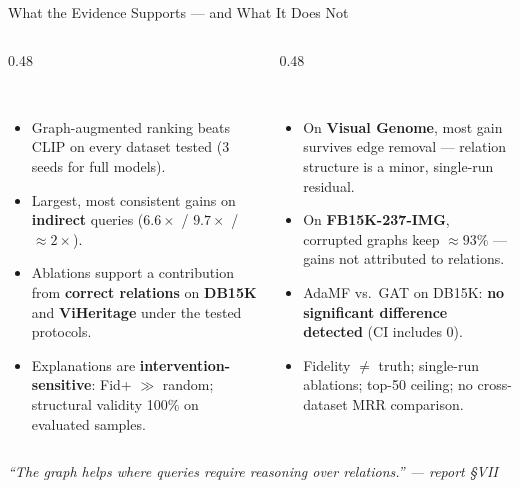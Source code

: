 \documentclass[aspectratio=169,10pt]{beamer}
\begin{document}
\begin{frame}{What the Evidence Supports --- and What It Does Not}
  \begin{columns}[t]
    \begin{column}{0.48\textwidth}
      \begin{block}{\textcolor{white}{Supported by experiments}}\footnotesize
        \begin{itemize}
          \item Graph-augmented ranking beats CLIP on every dataset tested (3 seeds for full models).
          \item Largest, most consistent gains on \textbf{indirect} queries ($6.6\times$ / $9.7\times$ / ${\approx}2\times$).
          \item Ablations support a contribution from \textbf{correct relations} on \textbf{DB15K} and \textbf{ViHeritage} under the tested protocols.
          \item Explanations are \textbf{intervention-sensitive}: Fid+ $\gg$ random; structural validity 100\% on evaluated samples.
        \end{itemize}
      \end{block}
    \end{column}
    \begin{column}{0.48\textwidth}
      \begin{alertblock}{\textcolor{white}{Not claimed / open}}\footnotesize
        \begin{itemize}
          \item On \textbf{Visual Genome}, most gain survives edge removal --- relation structure is a minor, single-run residual.
          \item On \textbf{FB15K-237-IMG}, corrupted graphs keep ${\approx}93\%$ --- gains not attributed to relations.
          \item AdaMF vs.\ GAT on DB15K: \textbf{no significant difference detected} (CI includes 0).
          \item Fidelity $\ne$ truth; single-run ablations; top-50 ceiling; no cross-dataset MRR comparison.
        \end{itemize}
      \end{alertblock}
    \end{column}
  \end{columns}
  \vspace{0.1cm}
  \begin{center}
    \footnotesize\itshape\color{Slate}
    ``The graph helps where queries require reasoning over relations.'' --- report \S VII
  \end{center}
\end{frame}
\end{document}

